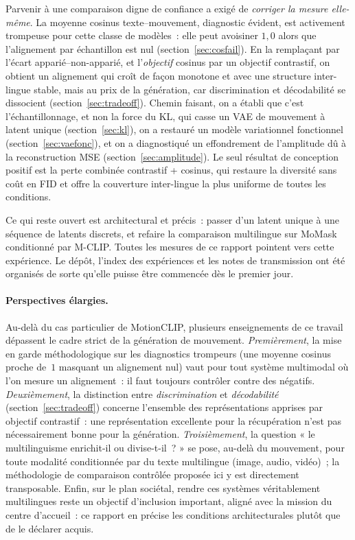 \documentclass[12pt,a4paper,oneside]{report}
\theoremstyle{definition}
\theoremstyle{plain}
\begin{document}
Parvenir à une comparaison digne de confiance a exigé de \emph{corriger la mesure
elle-même}. La moyenne cosinus texte--mouvement, diagnostic évident, est activement
trompeuse pour cette classe de modèles~: elle peut avoisiner $1{,}0$ alors que
l'alignement par échantillon est nul (section~\ref{sec:cosfail}). En la remplaçant
par l'écart apparié--non-apparié, et l'\emph{objectif} cosinus par un objectif
contrastif, on obtient un alignement qui croît de façon monotone et avec une
structure inter-lingue stable, mais au prix de la génération, car discrimination
et décodabilité se dissocient (section~\ref{sec:tradeoff}). Chemin faisant, on a
établi que c'est l'échantillonnage, et non la force du KL, qui casse un VAE de
mouvement à latent unique (section~\ref{sec:kl}), on a restauré un modèle
variationnel fonctionnel (section~\ref{sec:vaefonc}), et on a diagnostiqué un
effondrement de l'amplitude dû à la reconstruction MSE (section~\ref{sec:amplitude}).
Le seul résultat de conception positif est la perte combinée contrastif + cosinus,
qui restaure la diversité sans coût en FID et offre la couverture inter-lingue la
plus uniforme de toutes les conditions.

Ce qui reste ouvert est architectural et précis~: passer d'un latent unique à une
séquence de latents discrets, et refaire la comparaison multilingue sur MoMask
conditionné par M-CLIP. Toutes les mesures de ce rapport pointent vers cette
expérience. Le dépôt, l'index des expériences et les notes de transmission ont été
organisés de sorte qu'elle puisse être commencée dès le premier jour.

\paragraph{Perspectives élargies.} Au-delà du cas particulier de MotionCLIP,
plusieurs enseignements de ce travail dépassent le cadre strict de la génération de
mouvement. \emph{Premièrement}, la mise en garde méthodologique sur les diagnostics
trompeurs (une moyenne cosinus proche de~$1$ masquant un alignement nul) vaut pour
tout système multimodal où l'on mesure un alignement~: il faut toujours contrôler
contre des négatifs. \emph{Deuxièmement}, la distinction entre \emph{discrimination}
et \emph{décodabilité} (section~\ref{sec:tradeoff}) concerne l'ensemble des
représentations apprises par objectif contrastif~: une représentation excellente
pour la récupération n'est pas nécessairement bonne pour la génération.
\emph{Troisièmement}, la question « le multilinguisme enrichit-il ou divise-t-il~? »
se pose, au-delà du mouvement, pour toute modalité conditionnée par du texte
multilingue (image, audio, vidéo)~; la méthodologie de comparaison contrôlée
proposée ici y est directement transposable. Enfin, sur le plan sociétal, rendre ces
systèmes véritablement multilingues reste un objectif d'inclusion important, aligné
avec la mission du centre d'accueil~: ce rapport en précise les conditions
architecturales plutôt que de le déclarer acquis.
\end{document}
